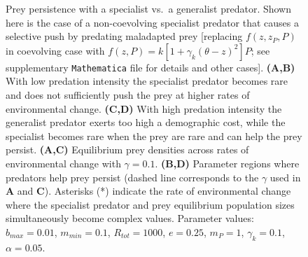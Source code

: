 \documentclass[11pt]{article}
\begin{document}
\begin{figure}[!h]
\centering
\caption{
Prey persistence with a specialist vs.\ a generalist predator. 
Shown here is the case of a non-coevolving specialist predator that causes a selective push by predating maladapted prey  [replacing $f(z,z_P,P)$ in coevolving case with $f(z,P) = k \left[1 + \gamma_k (\theta - z)^2 \right]P$; see supplementary \texttt{Mathematica} file for details and other cases].
\textbf{(A,B)} With low predation intensity the specialist predator becomes rare and does not sufficiently push the prey at higher rates of environmental change.
\textbf{(C,D)} With high predation intensity the generalist predator exerts too high a demographic cost, while the specialist becomes rare when the prey are rare and can help the prey persist.
\textbf{(A,C)} Equilibrium prey densities across rates of environmental change with $\gamma=0.1$. \textbf{(B,D)} Parameter regions where predators help prey persist (dashed line corresponds to the $\gamma$ used in \textbf{A} and \textbf{C}).
Asterisks (*) indicate the rate of environmental change where the specialist predator and prey equilibrium population sizes simultaneously become complex values.
Parameter values: $b_{max}=0.01$, $m_{min}=0.1$, $R_{tot}=1000$, $e=0.25$, $m_P=1$, $\gamma_k=0.1$, $\alpha=0.05$.
}
\label{GenVsSpec}
\end{figure}
\end{document}
